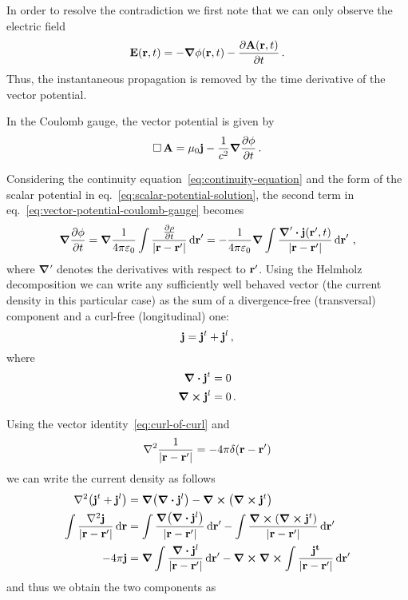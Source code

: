 \documentclass[class=report, crop=false]{standalone}
\begin{document}
In order to resolve the contradiction we first note that we can only observe
the electric field
\[
  \vb{E}(\vb{r}, t) = -\grad{\phi}(\vb{r},t) -\pdv{\vb{A}(\vb{r},t)}{t}\,.
\]
Thus, the instantaneous propagation is removed by the time derivative
of the vector potential.

In the Coulomb gauge, the vector potential is given by
\begin{equation}
  \label{eq:vector-potential-coulomb-gauge}
  \operatorname{\Box} \vb{A} = \mu_0 \vb{j} - \frac{1}{c^2} \grad{\pdv{\phi}{t}}\,.
\end{equation}

Considering the continuity equation~\eqref{eq:continuity-equation} and
the form of the scalar potential in eq.~\eqref{eq:scalar-potential-solution},
the second term in eq.~\eqref{eq:vector-potential-coulomb-gauge} becomes
\begin{equation}
  \label{eq:scalar-potential-continuity-equation}
  \grad{\pdv{\phi}{t}} = \grad \frac{1}{4\pi \varepsilon_0}
    \int \frac{\pdv{\rho}{t}}{|\vb{r}-\vb{r}'|} \dd{\vb{r}}'
    = - \frac{1}{4\pi \varepsilon_0} \grad
    \int \frac{\boldsymbol{\nabla}' \vdot \vb{j}(\vb{r}',t)}{|\vb{r}-\vb{r}'|} \dd{\vb{r}}'\,,
\end{equation}
where \(\boldsymbol{\nabla}'\) denotes the derivatives with respect to \(\vb{r}'\).
Using the Helmholz decomposition we can write any sufficiently well behaved
vector (the current density in this particular case) as the sum
of a divergence-free (transversal) component and a curl-free (longitudinal) one:
\[
  \vb{j} = \vb{j}^t + \vb{j}^l \,,
\]
where
\begin{align*}
  \div{\vb{j}^t} &= 0 \\
  \curl{\vb{j}^l} &= 0 \,.
\end{align*}

Using the vector identity~\eqref{eq:curl-of-curl} and
\[
  \laplacian{\frac{1}{|\vb{r}-\vb{r}'|}} = -4\pi \delta(\vb{r}-\vb{r}')
\]
we can write the current density as follows
\begin{align*}
  \laplacian(\vb{j}^t + \vb{j}^l) &= \grad(\div{\vb{j}^l}) - \curl(\curl{\vb{j}^t}) \\
  \int \frac{\laplacian{\vb{j}}}{|\vb{r}-\vb{r}'|} \dd{\vb{r}} &=
    \int \frac{\grad(\div{\vb{j}^l})}{|\vb{r}-\vb{r}'|} \dd{\vb{r}'}
    - \int \frac{\curl(\curl{\vb{j}^t})}{|\vb{r}-\vb{r}'|} \dd{\vb{r}'} \\
  -4\pi \vb{j} &= \grad \int \frac{\div{\vb{j}^l}}{|\vb{r}-\vb{r}'|} \dd{\vb{r}'}
    - \curl \curl \int \frac{\vb{j^t}}{|\vb{r}-\vb{r}'|} \dd{\vb{r}'}
\end{align*}
and thus we obtain the two components as
\end{document}
